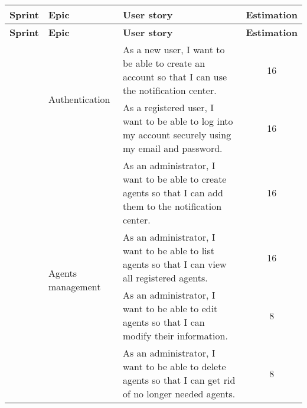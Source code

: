 \begin{longtable}{ | m{}  | m{} | m{} | c | }
    \hline
    \textbf{Sprint}         & \textbf{Epic}                                       & \textbf{User story}                                                                                                                   & \textbf{Estimation} \\
    \hline
    \endfirsthead
    \hline
    \textbf{Sprint}         & \textbf{Epic}                                       & \textbf{User story}                                                                                                                   & \textbf{Estimation} \\
    \hline
    \endhead
    \hline
    \endfoot
    \endlastfoot
    \multirow[t]{3}{5em}{1} & \multirow{2}{5em}{Authentication}                   & As a new user, I want to be able to create an account so that I can use the notification center.                                      & 16                  \\
    \cline{3-4}
                            &                                                     & As a registered user, I want to be able to log into my account securely using my email and password.                                  & 16                  \\
    \cline{2-4}
                            & \multirow{4}{5em}{Agents management}                & As an administrator, I want to be able to create agents so that I can add them to the notification center.                            & 16                  \\
    \cline{3-4}
                            &                                                     & As an administrator, I want to be able to list agents so that I can view all registered agents.                                       & 16                  \\
    \cline{3-4}
                            &                                                     & As an administrator, I want to be able to edit agents so that I can modify their information.                                         & 8                   \\
    \cline{3-4}
                            &                                                     & As an administrator, I want to be able to delete agents so that I can get rid of no longer needed agents.                             & 8                   \\
    \cline{2-4}

\end{longtable}
